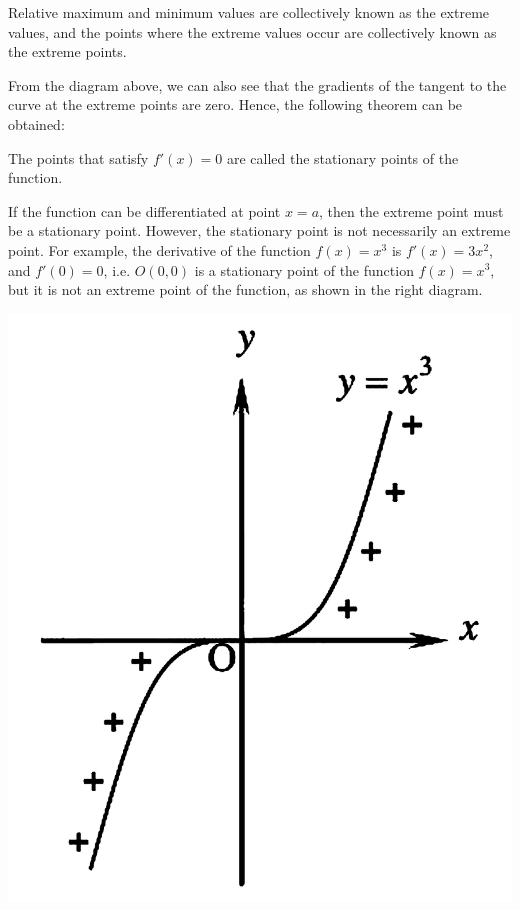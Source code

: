 Relative maximum and minimum values are collectively known as the extreme
values, and the points where the extreme values occur are collectively known as
the extreme points.

From the diagram above, we can also see that the gradients of the tangent to
the curve at the extreme points are zero. Hence, the following theorem can be
obtained:
\begin{center}
\end{center}

\begin{multicols}{2}
    The points that satisfy $f'(x)=0$ are called the stationary points of the
    function.

    If the function can be differentiated at point $x=a$, then the extreme point
    must be a stationary point. However, the stationary point is not necessarily an
    extreme point. For example, the derivative of the function $f(x)=x^3$ is
    $f'(x)=3x^2$, and $f'(0)=0$, i.e. $O(0, 0)$ is a stationary point of the
    function $f(x)=x^3$, but it is not an extreme point of the function, as shown
    in the right diagram. \vfill{}\null{}

    \columnbreak
    \begin{center}
        \includegraphics[scale=0.25]{assets/26-7.png}
    \end{center}
\end{multicols}

